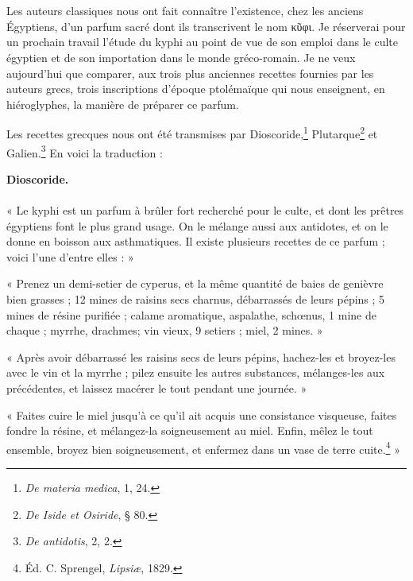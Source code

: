 \documentclass[a4paper, 11pt, oneside, landscape]{article}
\begin{document}
\section{}
\paragraph{}
Les auteurs classiques nous ont fait connaître l'existence, chez les anciens Égyptiens, d'un parfum sacré dont ils transcrivent le nom κῦφι. Je réserverai pour un prochain travail l'étude du kyphi au point de vue de son emploi dans le culte égyptien et de son importation dans le monde gréco-romain. Je ne veux aujourd'hui que comparer, aux trois plus anciennes recettes fournies par les auteurs grecs, trois inscriptions d'époque ptolémaïque qui nous enseignent, en hiéroglyphes, la manière de préparer ce parfum.

Les recettes grecques nous ont été transmises par Dioscoride,\footnote{\emph{De materia medica}, 1, 24.} Plutarque\footnote{\emph{De Iside et Osiride}, § 80.} et Galien.\footnote{\emph{De antidotis}, 2, 2.} En voici la traduction :

\bigskip

\begin{center}
\textbf{Dioscoride.}
\end{center}
\paragraph{}
« Le kyphi est un parfum à brûler fort recherché pour le culte, et dont les prêtres égyptiens font le plus grand usage. On le mélange aussi aux antidotes, et on le donne en boisson aux asthmatiques. Il existe plusieurs recettes de ce parfum ; voici l'une d'entre elles : »

« Prenez un demi-setier de cyperus, et la même quantité de baies de genièvre bien grasses ; 12 mines de raisins secs charnus, débarrassés de leurs pépins ; 5 mines de résine purifiée ; calame aromatique, aspalathe, schœnus, 1 mine de chaque ; myrrhe, drachmes; vin vieux, 9 setiers ; miel, 2 mines. »

« Après avoir débarrassé les raisins secs de leurs pépins, hachez-les et broyez-les avec le vin et la myrrhe ; pilez ensuite les autres substances, mélanges-les aux précédentes, et laissez macérer le tout pendant une journée. »

« Faites cuire le miel jusqu'à ce qu'il ait acquis une consistance visqueuse, faites fondre la résine, et mélangez-la soigneusement au miel. Enfin, mêlez le tout ensemble, broyez bien soigneusement, et enfermez dans un vase de terre cuite.\footnote{Éd. C. Sprengel, \emph{Lipsiæ}, 1829.} »
\end{document}
